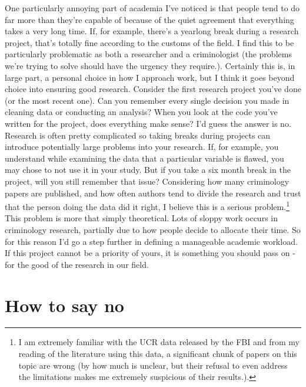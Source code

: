 \documentclass[
  12pt,
]{book}
\begin{document}
One particularly annoying part of academia I've noticed is that people tend to do far more than they're capable of because of the quiet agreement that everything takes a very long time. If, for example, there's a yearlong break during a research project, that's totally fine according to the customs of the field. I find this to be particularly problematic as both a researcher and a criminologist (the problems we're trying to solve should have the urgency they require.). Certainly this is, in large part, a personal choice in how I approach work, but I think it goes beyond choice into ensuring good research. Consider the first research project you've done (or the most recent one). Can you remember every single decision you made in cleaning data or conducting an analysis? When you look at the code you've written for the project, does everything make sense? I'd guess the answer is no. Research is often pretty complicated so taking breaks during projects can introduce potentially large problems into your research. If, for example, you understand while examining the data that a particular variable is flawed, you may chose to not use it in your study. But if you take a six month break in the project, will you still remember that issue? Considering how many criminology papers are published, and how often authors tend to divide the research and trust that the person doing the data did it right, I believe this is a serious problem.\footnote{I am extremely familiar with the UCR data released by the FBI and from my reading of the literature using this data, a significant chunk of papers on this topic are wrong (by how much is unclear, but their refusal to even address the limitations makes me extremely suspicious of their results.).} This problem is more that simply theoretical. Lots of sloppy work occurs in criminology research, partially due to how people decide to allocate their time. So for this reason I'd go a step further in defining a manageable academic workload. If this project cannot be a priority of yours, it is something you should pass on - for the good of the research in our field.

\hypertarget{how-to-say-no}{%
\section{How to say no}\label{how-to-say-no}}
\end{document}
